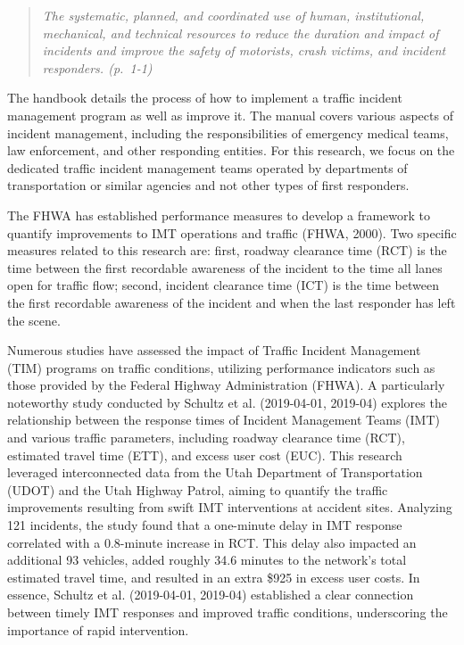 \documentclass[fancy, oneside, mastersfancy, ms]{byuthesis}
\begin{document}
\begin{quote}
\emph{The systematic, planned, and coordinated use of human,
institutional, mechanical, and technical resources to reduce the
duration and impact of incidents and improve the safety of motorists,
crash victims, and incident responders. (p.~1-1)}
\end{quote}

The handbook details the process of how to implement a traffic incident
management program as well as improve it. The manual covers various
aspects of incident management, including the responsibilities of
emergency medical teams, law enforcement, and other responding entities.
For this research, we focus on the dedicated traffic incident management
teams operated by departments of transportation or similar agencies and
not other types of first responders.

The FHWA has established performance measures to develop a framework to
quantify improvements to IMT operations and traffic (FHWA, 2000). Two
specific measures related to this research are: first, roadway clearance
time (RCT) is the time between the first recordable awareness of the
incident to the time all lanes open for traffic flow; second, incident
clearance time (ICT) is the time between the first recordable awareness
of the incident and when the last responder has left the scene.

Numerous studies have assessed the impact of Traffic Incident Management
(TIM) programs on traffic conditions, utilizing performance indicators
such as those provided by the Federal Highway Administration (FHWA). A
particularly noteworthy study conducted by Schultz et al. (2019-04-01,
2019-04) explores the relationship between the response times of
Incident Management Teams (IMT) and various traffic parameters,
including roadway clearance time (RCT), estimated travel time (ETT), and
excess user cost (EUC). This research leveraged interconnected data from
the Utah Department of Transportation (UDOT) and the Utah Highway
Patrol, aiming to quantify the traffic improvements resulting from swift
IMT interventions at accident sites. Analyzing 121 incidents, the study
found that a one-minute delay in IMT response correlated with a
0.8-minute increase in RCT. This delay also impacted an additional 93
vehicles, added roughly 34.6 minutes to the network's total estimated
travel time, and resulted in an extra \$925 in excess user costs. In
essence, Schultz et al. (2019-04-01, 2019-04) established a clear
connection between timely IMT responses and improved traffic conditions,
underscoring the importance of rapid intervention.
\end{document}
